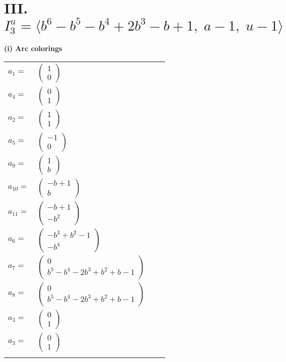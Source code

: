 \documentclass[1p]{elsarticle_modified}
\theoremstyle{definition}
\begin{document}
\centering \section*{III. $I^u_{3}= \langle b^6- b^5- b^4+2 b^3- b+1,\;a-1,\;u-1 \rangle$}
\flushleft \textbf{(i) Arc colorings}\\
\begin{tabular}{m{7pt} m{180pt} m{7pt} m{180pt} }
\flushright $a_{1}=$&$\begin{pmatrix}1\\0\end{pmatrix}$ \\
\flushright $a_{4}=$&$\begin{pmatrix}0\\1\end{pmatrix}$ \\
\flushright $a_{2}=$&$\begin{pmatrix}1\\1\end{pmatrix}$ \\
\flushright $a_{5}=$&$\begin{pmatrix}-1\\0\end{pmatrix}$ \\
\flushright $a_{9}=$&$\begin{pmatrix}1\\b\end{pmatrix}$ \\
\flushright $a_{10}=$&$\begin{pmatrix}- b+1\\b\end{pmatrix}$ \\
\flushright $a_{11}=$&$\begin{pmatrix}- b+1\\- b^2\end{pmatrix}$ \\
\flushright $a_{6}=$&$\begin{pmatrix}- b^3+b^2-1\\- b^4\end{pmatrix}$ \\
\flushright $a_{7}=$&$\begin{pmatrix}0\\b^5- b^4-2 b^3+b^2+b-1\end{pmatrix}$ \\
\flushright $a_{8}=$&$\begin{pmatrix}0\\b^5- b^4-2 b^3+b^2+b-1\end{pmatrix}$ \\
\flushright $a_{3}=$&$\begin{pmatrix}0\\1\end{pmatrix}$\\ \flushright $a_{3}=$&$\begin{pmatrix}0\\1\end{pmatrix}$\\&\end{tabular}
\end{document}
